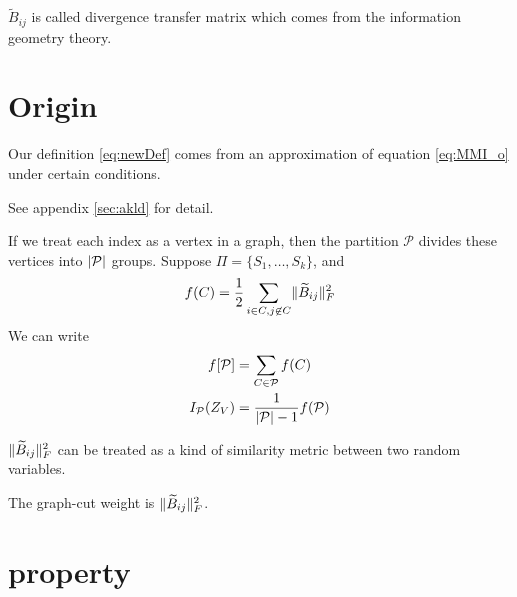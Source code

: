 \documentclass{article}
\def\P{\mathcal{P}}
\DeclarePairedDelimiter\abs{\lvert}{\rvert}
\DeclarePairedDelimiter\norm{\lVert}{\rVert}
\theoremstyle{definition}
\begin{document}
$\widetilde{B}_{ij}$ is called divergence transfer matrix which comes from the information geometry theory.

\section{Origin}
Our definition \eqref{eq:newDef} comes from an approximation of equation \eqref{eq:MMI_o} under certain conditions.

See appendix \ref{sec:akld} for detail.



If we treat each index as a vertex in a graph, then the partition $\P$ divides these vertices into $\abs{\P}$ groups. 
Suppose $\Pi = \{S_1, \dots, S_k\}$, and 
\begin{equation}
f(C) = {1 \over 2}\sum_{i\in C, j \not\in C} \norm{\widetilde{B}_{ij}}_F^2
\end{equation}
We can write 
\begin{align}
f[\P] & = \sum_{C \in \P} f(C) \\
I_{\mathcal{P}}(Z_V)  &= { 1 \over \abs{\P}  - 1}f(\P) 
\end{align}

$\norm{\widetilde{B}_{ij}}_F^2$ can be treated as a kind of similarity metric between two random variables.

The graph-cut weight is $\norm{\widetilde{B}_{ij}}_F^2$.

\section{property}
\end{document}
